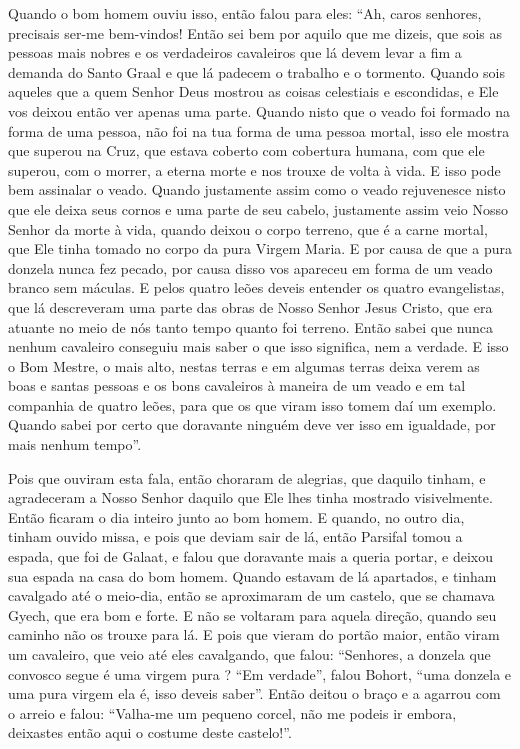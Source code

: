 Quando o bom homem ouviu isso, então falou para eles: “Ah, caros senhores,
precisais ser-me bem-vindos! Então sei bem por aquilo que me dizeis, que sois
as pessoas mais nobres e os verdadeiros cavaleiros que lá devem levar a fim a
demanda do Santo Graal e que lá padecem o trabalho e o tormento. Quando sois
aqueles que a quem Senhor Deus mostrou as coisas celestiais e escondidas, e Ele
vos deixou então ver apenas uma parte. Quando nisto que o veado foi formado na
forma de uma pessoa, não foi na tua forma de uma pessoa mortal, isso ele mostra
que superou na Cruz, que estava coberto com cobertura humana, com que ele
superou, com o morrer, a eterna morte e nos trouxe de volta à vida. E isso pode
bem assinalar o veado. Quando justamente assim como o veado rejuvenesce nisto
que ele deixa seus cornos e uma parte de seu cabelo, justamente assim veio
Nosso Senhor da morte à vida, quando deixou o corpo terreno, que é a carne
mortal, que Ele tinha tomado no corpo da pura Virgem Maria. E por causa de que
a pura donzela nunca fez pecado, por causa disso vos apareceu em forma de um
veado branco sem máculas. E pelos quatro leões deveis entender os quatro
evangelistas, que lá descreveram uma parte das obras de Nosso Senhor Jesus
Cristo, que era atuante no meio de nós  tanto tempo quanto foi terreno. Então
sabei que nunca nenhum cavaleiro conseguiu mais saber o que isso significa, nem
a verdade. E isso o Bom Mestre, o mais alto, nestas terras e em algumas terras
deixa verem as boas e santas pessoas e os bons cavaleiros à maneira de um veado
e em tal companhia de quatro leões, para que os que viram isso tomem daí um
exemplo. Quando sabei por certo que doravante ninguém deve ver isso em
igualdade, por mais nenhum tempo”. 

Pois que ouviram esta fala, então choraram de alegrias, que daquilo tinham, e
agradeceram a Nosso Senhor daquilo que Ele lhes tinha mostrado visivelmente.
Então ficaram o dia inteiro junto ao bom homem. E quando, no outro dia, tinham
ouvido missa, e pois que deviam sair de lá, então Parsifal tomou a espada, que
foi de Galaat, e falou que doravante mais a queria portar, e deixou sua espada
na casa do bom homem. Quando estavam de lá apartados, e tinham cavalgado até o
meio-dia, então se aproximaram de um castelo, que se chamava Gyech, que era bom
e forte. E não se voltaram para aquela direção, quando seu caminho não os
trouxe para lá. E pois que vieram do portão maior, então viram um cavaleiro,
que veio até eles cavalgando, que falou: “Senhores, a donzela que convosco
segue é uma virgem pura ? “Em verdade”, falou Bohort, “uma donzela e uma pura
virgem ela é, isso deveis saber”. Então deitou o braço e a agarrou com o arreio
e falou: “Valha-me um pequeno corcel, não me podeis ir embora, deixastes então
aqui o costume deste castelo!”. 

